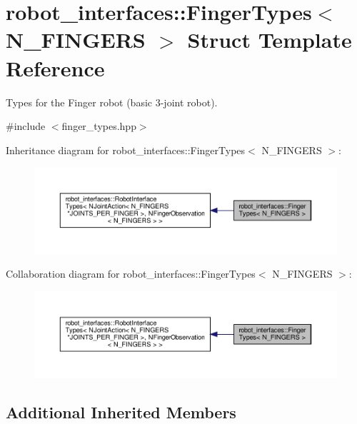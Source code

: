 \hypertarget{structrobot__interfaces_1_1FingerTypes}{}\section{robot\+\_\+interfaces\+:\+:Finger\+Types$<$ N\+\_\+\+F\+I\+N\+G\+E\+RS $>$ Struct Template Reference}
\label{structrobot__interfaces_1_1FingerTypes}


Types for the Finger robot (basic 3-\/joint robot).  




{\ttfamily \#include $<$finger\+\_\+types.\+hpp$>$}



Inheritance diagram for robot\+\_\+interfaces\+:\+:Finger\+Types$<$ N\+\_\+\+F\+I\+N\+G\+E\+RS $>$\+:
\nopagebreak
\begin{figure}[H]
\begin{center}
\leavevmode
\includegraphics[width=350pt]{structrobot__interfaces_1_1FingerTypes__inherit__graph}
\end{center}
\end{figure}


Collaboration diagram for robot\+\_\+interfaces\+:\+:Finger\+Types$<$ N\+\_\+\+F\+I\+N\+G\+E\+RS $>$\+:
\nopagebreak
\begin{figure}[H]
\begin{center}
\leavevmode
\includegraphics[width=350pt]{structrobot__interfaces_1_1FingerTypes__coll__graph}
\end{center}
\end{figure}
\subsection*{Additional Inherited Members}


